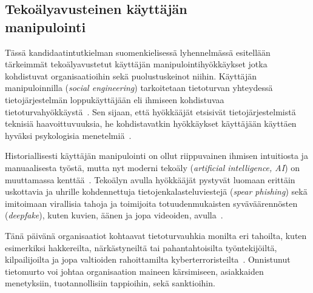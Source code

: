 
\begin{otherlanguage}{finnish}
\chapter*{Tekoälyavusteinen käyttäjän\\manipulointi\label{chapter:finnish}}
\begin{comment}
- erikoismerkkeinä piiloutuva tavutusohje ja sanarajaa luomaton välilyönti
- pitää olla viimeisteltyä kirjakieltä (ei alan slangia: koneiden kaatumisia...)
- taitto on siisti
- marginaaliin valuvat pitkät sanat katkaistaan
- (ali)luvun viimeiset ja ensimmäiset rivit pakotetaan samalle sivulle yhteenkuuluvien kanssa (tai tuomaan mukanaan toinenkin rivi)

\end{comment}


Tässä kandidaatintutkielman suomenkielisessä lyhennelmässä esitellään tärkeimmät tekoälyavustetut käyttäjän manipulointihyökkäykset jotka kohdistuvat organisaatioihin sekä puolustuskeinot niihin. Käyttäjän manipuloinnilla (\textit{social engineering}) tarkoitetaan tietoturvan yhteydessä tietojärjestelmän loppukäyttäjään eli ihmiseen kohdistuvaa tietoturvahyökkäystä~\citep{hatfield_SE_Evolution_Concept_2018}. Sen sijaan, että hyökkääjät etsisivät tietojärjestelmistä teknisiä haavoittuvuuksia, he kohdistavatkin hyökkäykset käyttäjään käyttäen hyväksi psykologisia menetelmiä~\citep{wang_Defining_Social_Engineering_2020}.

Historiallisesti käyttäjän manipulointi on ollut riippuvainen ihmisen intuitiosta ja manuaalisesta työstä, mutta nyt moderni tekoäly (\textit{artificial intelligence, AI}) on muuttamassa kenttää~\citep{blauth_AI_Crime_Overview_Malicious_Use_Abuse_2022, king_AI_Crime_Interdisciplinary_Analysis_2019, mirsky_Threat_Offensive_AI_Organizations_2023}. Tekoälyn avulla hyökkääjät pystyvät luomaan erittäin uskottavia ja uhrille kohdennettuja tietojenkalasteluviestejä (\textit{spear phishing}) sekä imitoimaan virallisia tahoja ja toimijoita totuudenmukaisten syväväärennösten (\textit{deepfake}), kuten kuvien, äänen ja jopa videoiden, avulla~\citep{mirsky_Creation_Detection_Deepfakes_2021}.

Tänä päivänä organisaatiot kohtaavat tietoturvauhkia monilta eri tahoilta, kuten esimerkiksi hakkereilta, närkästyneiltä tai pahantahtoisilta työntekijöiltä, kilpailijoilta ja jopa valtioiden rahoittamilta kyberterroristeilta~\citep{mirsky_Threat_Offensive_AI_Organizations_2023}. Onnistunut tietomurto voi johtaa organisaation maineen kärsimiseen, asiakkaiden menetyksiin, tuotannollisiin tappioihin, sekä sanktioihin.


\end{otherlanguage}
